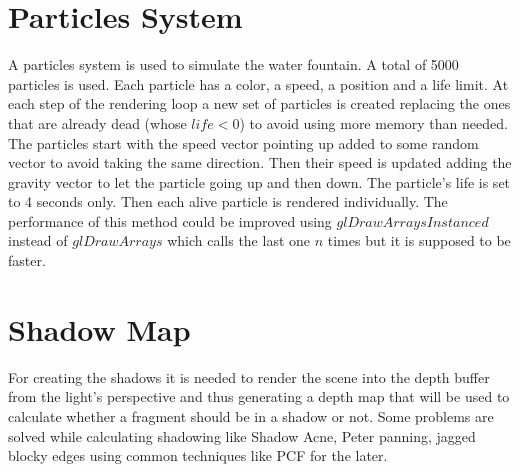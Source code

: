 \documentclass{article}
\begin{document}
\section{Particles System}
A particles system is used to simulate the water fountain. A total of 5000 particles is used. Each particle has a color, a speed, a position and a life limit.
At each step of the rendering loop a new set of particles is created replacing the ones that are already dead (whose $life < 0$) to avoid using more memory than needed.
The particles start with the speed vector pointing up added to some random vector to avoid taking the same direction. Then their speed is updated adding the gravity vector to let the particle going up and then down. The particle's life is set to 4 seconds only. Then each alive particle is rendered individually. The performance of this method could be improved using $glDrawArraysInstanced$ instead of $glDrawArrays$ which calls the last one $n$ times but it is supposed to be faster.

\section{Shadow Map}
For creating the shadows it is needed to render the scene into the depth buffer from the light's perspective and thus generating a depth map that will be used to calculate whether a fragment should be in a shadow or not. Some problems are solved while calculating shadowing like Shadow Acne, Peter panning, jagged blocky edges using common techniques like PCF for the later.
\printbibliography
\end{document}
